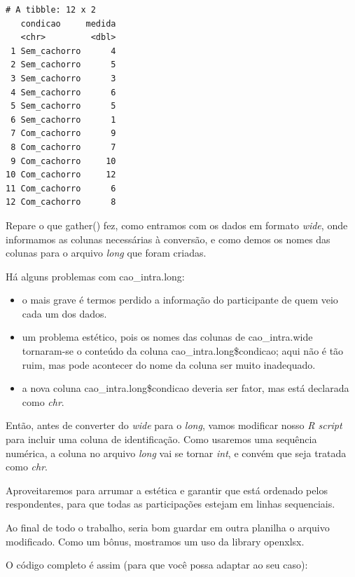 \documentclass[
]{article}
\providecommand{\tightlist}{%
  \setlength{\itemsep}{0pt}\setlength{\parskip}{0pt}}
\begin{document}
\begin{verbatim}
# A tibble: 12 x 2
   condicao     medida
   <chr>         <dbl>
 1 Sem_cachorro      4
 2 Sem_cachorro      5
 3 Sem_cachorro      3
 4 Sem_cachorro      6
 5 Sem_cachorro      5
 6 Sem_cachorro      1
 7 Com_cachorro      9
 8 Com_cachorro      7
 9 Com_cachorro     10
10 Com_cachorro     12
11 Com_cachorro      6
12 Com_cachorro      8
\end{verbatim}

Repare o que gather() fez, como entramos com os dados em formato
\emph{wide}, onde informamos as colunas necessárias à conversão, e como
demos os nomes das colunas para o arquivo \emph{long} que foram criadas.

Há alguns problemas com cao\_intra.long:

\begin{itemize}
\tightlist
\item
  o mais grave é termos perdido a informação do participante de quem
  veio cada um dos dados.
\item
  um problema estético, pois os nomes das colunas de cao\_intra.wide
  tornaram-se o conteúdo da coluna cao\_intra.long\$condicao; aqui não é
  tão ruim, mas pode acontecer do nome da coluna ser muito inadequado.
\item
  a nova coluna cao\_intra.long\$condicao deveria ser fator, mas está
  declarada como \emph{chr}.
\end{itemize}

Então, antes de converter do \emph{wide} para o \emph{long}, vamos
modificar nosso \emph{R script} para incluir uma coluna de
identificação. Como usaremos uma sequência numérica, a coluna no arquivo
\emph{long} vai se tornar \emph{int}, e convém que seja tratada como
\emph{chr}.

Aproveitaremos para arrumar a estética e garantir que está ordenado
pelos respondentes, para que todas as participações estejam em linhas
sequenciais.

Ao final de todo o trabalho, seria bom guardar em outra planilha o
arquivo modificado. Como um bônus, mostramos um uso da library openxlsx.

O código completo é assim (para que você possa adaptar ao seu caso):
\end{document}
